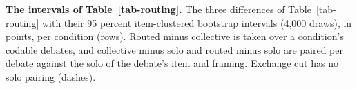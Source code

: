 \begin{table}[t]
\centering
\caption{\textbf{The intervals of Table~\ref{tab-routing}.}
The three differences of Table~\ref{tab-routing} with their 95
percent item-clustered bootstrap intervals (4,000 draws), in points, per
condition (rows). Routed minus collective is taken over a condition's
codable debates, and collective minus solo and routed minus solo are paired
per debate against the solo of the debate's item and framing. Exchange cut
has no solo pairing (dashes).}
\label{tab-app-routing-ci}

\end{table}

